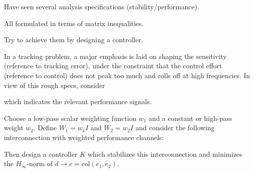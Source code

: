 \documentclass[12pt]{article}
\newcommand{\Hi}{H_\infty}
\begin{document}
\newpage{}

Have seen several analysis specifications (stability/performance).

 All formulated in terms of matrix inequalities.

 Try to achieve them by designing a controller.




\newpage{}

In a tracking problem, a major emphasis is laid on shaping the sensitivity (reference to tracking error), under
the constraint that the control effort (reference to control) does not peak too much and rolls off at high frequencies. In view of this rough specs,
consider


which indicates the relevant performance signals.

\newpage{}


Choose a low-pass scalar weighting function $w_1$ and a constant or high-pass weight $w_2$. Define $W_1=w_1I$ and
$W_2=w_2I$ and consider the following interconnection with weighted performance channels:


Then design a controller $K$ which stabilizes this interconnection and minimizes
the $\Hi$-norm of $d\to e=\text{col}(e_1,e_2)$.




\label{lastpage}
\end{document}
